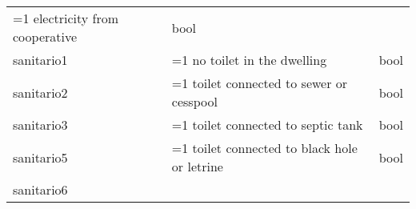 \documentclass[11pt]{article}
\begin{document}
\begin{longtable}[]{@{}lll@{}}
\begin{minipage}[t]{0.16\columnwidth}
=1 electricity from cooperative\strut
\end{minipage} & \begin{minipage}[t]{0.24\columnwidth}\raggedright\strut
bool\strut
\end{minipage}\tabularnewline
\begin{minipage}[t]{0.19\columnwidth}\raggedright\strut
sanitario1\strut
\end{minipage} & \begin{minipage}[t]{0.16\columnwidth}\raggedright\strut
=1 no toilet in the dwelling\strut
\end{minipage} & \begin{minipage}[t]{0.24\columnwidth}\raggedright\strut
bool\strut
\end{minipage}\tabularnewline
\begin{minipage}[t]{0.19\columnwidth}\raggedright\strut
sanitario2\strut
\end{minipage} & \begin{minipage}[t]{0.16\columnwidth}\raggedright\strut
=1 toilet connected to sewer or cesspool\strut
\end{minipage} & \begin{minipage}[t]{0.24\columnwidth}\raggedright\strut
bool\strut
\end{minipage}\tabularnewline
\begin{minipage}[t]{0.19\columnwidth}\raggedright\strut
sanitario3\strut
\end{minipage} & \begin{minipage}[t]{0.16\columnwidth}\raggedright\strut
=1 toilet connected to septic tank\strut
\end{minipage} & \begin{minipage}[t]{0.24\columnwidth}\raggedright\strut
bool\strut
\end{minipage}\tabularnewline
\begin{minipage}[t]{0.19\columnwidth}\raggedright\strut
sanitario5\strut
\end{minipage} & \begin{minipage}[t]{0.16\columnwidth}\raggedright\strut
=1 toilet connected to black hole or letrine\strut
\end{minipage} & \begin{minipage}[t]{0.24\columnwidth}\raggedright\strut
bool\strut
\end{minipage}\tabularnewline
\begin{minipage}[t]{0.19\columnwidth}\raggedright\strut
sanitario6\strut
\end{minipage} & \begin{minipage}[t]{0.16\columnwidth}\raggedright\strut

\end{minipage}
\end{longtable}
\end{document}
